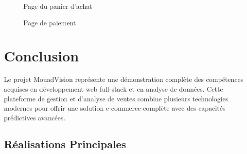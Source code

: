 \documentclass[12pt,a4paper]{report}
\begin{document}
\begin{figure}[H]
    \centering
    \caption{Page du panier d'achat}
    \label{fig:cart}
\end{figure}

\begin{figure}[H]
    \centering
    \caption{Page de paiement}
    \label{fig:checkout}
\end{figure}

\chapter*{Conclusion}

Le projet MouadVision représente une démonstration complète des compétences acquises en développement web full-stack et en analyse de données. Cette plateforme de gestion et d'analyse de ventes combine plusieurs technologies modernes pour offrir une solution e-commerce complète avec des capacités prédictives avancées.

\section*{Réalisations Principales}
\end{document}
